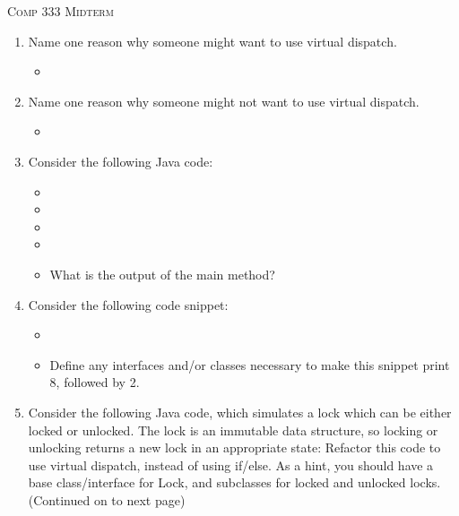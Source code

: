 \documentclass[12pt,a4paper]{article}
\begin{document}
  \begin{center}
    \large\textsc{Comp 333 Midterm}
  \end{center}
  \begin{enumerate}
    \item Name one reason why someone might want to use virtual dispatch. %
    \begin{itemize}
      \item 
    \end{itemize}
    \item Name one reason why someone might not want to use virtual dispatch. %
    \begin{itemize}
      \item
    \end{itemize}
    \clearpage
    \item Consider the following Java code: %
    \begin{itemize}
      \item[] 
      \item[] 
      \item[] 
      \item[] 
      \item[] What is the output of the main method? 
    \end{itemize}
    \clearpage
    \item Consider the following code snippet: %
    \begin{itemize}
      \item[] 
      \item[] Define any interfaces and/or classes necessary to make this snippet print 8, followed by 2. 
    \end{itemize}
    \clearpage
    \item Consider the following Java code, which simulates a lock which can be either locked or
    unlocked. The lock is an immutable data structure, so locking or unlocking returns a new lock
    in an appropriate state: Refactor this code to use virtual dispatch, instead of using if/else. As a hint, you should have a
    base class/interface for Lock, and subclasses for locked and unlocked locks. (Continued on to
    next page) %
    \begin{itemize}

\end{itemize}
\end{enumerate}
\end{document}

